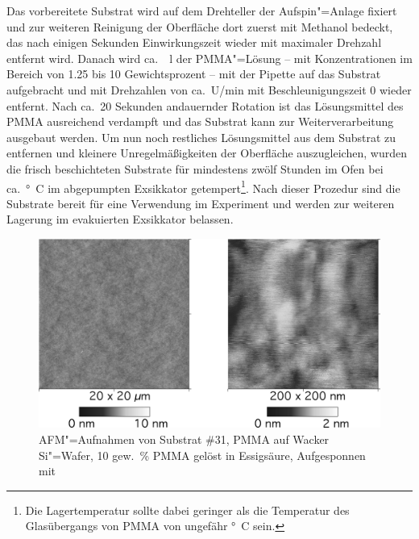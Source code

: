 \enlargethispage{-1\baselineskip}
Das vorbereitete Substrat wird auf dem Drehteller der Aufspin"=Anlage fixiert und zur weiteren Reinigung der Oberfläche dort zuerst mit Methanol bedeckt, das nach einigen Sekunden Einwirkungszeit wieder mit maximaler Drehzahl entfernt wird. Danach wird ca.\ \unit[100]{\grmu l}  der PMMA"=Lösung -- mit Konzentrationen im Bereich von 1.25 bis 10 Gewichtsprozent -- mit der Pipette auf das Substrat aufgebracht und mit Drehzahlen von ca.\ \unit[4500]{U/min} mit Beschleunigungszeit 0 wieder entfernt. Nach ca.\ 20 Sekunden andauernder Rotation ist das Lösungsmittel des PMMA ausreichend verdampft und das Substrat kann zur Weiterverarbeitung ausgebaut werden. Um nun noch restliches Lösungsmittel aus dem Substrat zu entfernen und kleinere  
Unregelmäßigkeiten der Oberfläche auszugleichen, wurden die frisch beschichteten Substrate für mindestens zwölf Stunden im Ofen bei ca.\ \unit[60]{°C} im abgepumpten Exsikkator getempert\footnote{Die Lagertemperatur sollte dabei geringer als die Temperatur des Glasübergangs von PMMA von ungefähr \unit[80]{°C} sein.}. Nach dieser Prozedur sind die Substrate bereit für eine Verwendung im Experiment und werden zur weiteren Lagerung im evakuierten Exsikkator belassen.
\begin{figure}[h!tbp]
	\includegraphics{exp_substrate/PMMA_AFM}
	\begin{minipage}[b]{\linewidth-\tabcolsep-10.3cm}
	\caption[AFM"=Aufnahmen der Oberfläche eines PMMA"=Substrats]{AFM"=Aufnahmen von Substrat \#31, PMMA auf Wacker Si"=Wafer, 10 gew.~\% PMMA gelöst in Essigsäure, Aufgesponnen mit }
	\label{fig:afm_pmma}
	\end{minipage}
\end{figure}

